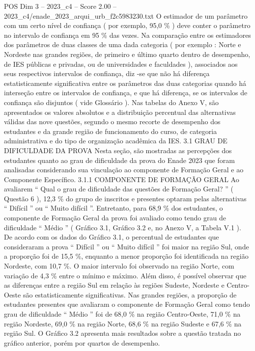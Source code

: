 \begin{textsample}{POS Dim 3 – 2023\_c4 – Score 2.00 – 2023\_c4/enade\_2023\_arqui\_urb\_f2c5983230.txt}
O estimador de um parâmetro com um certo nível de confiança ( por exemplo, 95,0 \% ) deve conter o parâmetro no intervalo de confiança em 95 \% das vezes.
Na comparação entre os estimadores dos parâmetros de duas classes de uma dada categoria ( por exemplo : Norte e Nordeste nas grandes regiões, de primeiro e último quarto dentro de desempenho, de IES públicas e privadas, ou de universidades e faculdades ), associados aos seus respectivos intervalos de confiança, diz -se que não há diferença estatisticamente significativa entre os parâmetros das duas categorias quando há interseção entre os intervalos de confiança, e que há diferença, se os intervalos de confiança são disjuntos ( vide Glossário ).
Nas tabelas do Anexo V, são apresentados os valores absolutos e a distribuição percentual das alternativas válidas das nove questões, segundo o mesmo recorte de desempenho dos estudantes e da grande região de funcionamento do curso, de categoria administrativa e do tipo de organização acadêmica da IES. 3.1 GRAU DE DIFICULDADE DA PROVA Nesta seção, são mostradas as percepções dos estudantes quanto ao grau de dificuldade da prova do Enade 2023 que foram analisadas considerando sua vinculação ao componente de Formação Geral e ao Componente Específico. 3.1.1 COMPONENTE DE FORMAÇÃO GERAL Ao avaliarem “ Qual o grau de dificuldade das questões de Formação Geral? ” ( Questão 6 ), 12,3 \% do grupo de inscritos e presentes optaram pelas alternativas “ Difícil ” ou “ Muito difícil ”.
Entretanto, para 68,9 \% dos estudantes, o componente de Formação Geral da prova foi avaliado como tendo grau de dificuldade “ Médio ” ( Gráfico 3.1, Gráfico 3.2 e, no Anexo V, a Tabela V.1 ).
De acordo com os dados do Gráfico 3.1, o percentual de estudantes que consideraram a prova “ Difícil ” ou “ Muito difícil ” foi maior na região Sul, onde a proporção foi de 15,5 \%, enquanto a menor proporção foi identificada na região Nordeste, com 10,7 \%.
O maior intervalo foi observado na região Norte, com variação de 4,3 \% entre o mínimo e máximo.
Além disso, é possível observar que as diferenças entre a região Sul em relação às regiões Sudeste, Nordeste e Centro-Oeste são estatisticamente significativas.
Nas grandes regiões, a proporção de estudantes presentes que avaliaram o componente de Formação Geral como tendo grau de dificuldade “ Médio ” foi de 68,0 \% na região Centro-Oeste, 71,0 \% na região Nordeste, 69,0 \% na região Norte, 68,6 \% na região Sudeste e 67,6 \% na região Sul.
O Gráfico 3.2 apresenta mais resultados sobre a questão tratada no gráfico anterior, porém por quartos de desempenho.

\end{textsample}
